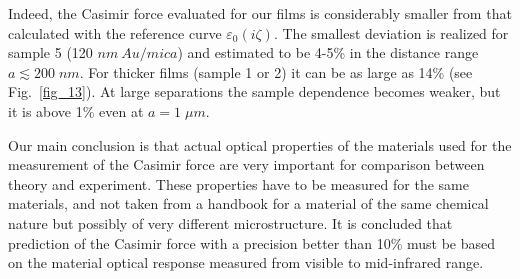 \documentclass[prb]{revtex4}%
\begin{document}
Indeed, the Casimir force evaluated for our films is considerably
smaller from that calculated with the reference curve
$\varepsilon_0(i\zeta)$. The smallest deviation is realized for
sample 5 (120 $nm\ Au/mica$) and estimated to be 4-5\% in the
distance range $a\lesssim 200\;nm$. For thicker films (sample 1 or
2) it can be as large as 14\% (see Fig.~\ref{fig_13}). At large
separations the sample dependence becomes weaker, but it is above
1\% even at $a=1\;\mu m$.

Our main conclusion is that actual optical properties of the
materials used for the measurement of the Casimir force are very
important for comparison between theory and experiment. These
properties have to be measured for the same materials, and not taken
from a handbook for a material of the same chemical nature but
possibly of very different microstructure. It is concluded that
prediction of the Casimir force  with a precision better than 10\%
must be based on the material optical response measured from visible
to mid-infrared range.
\end{document}

